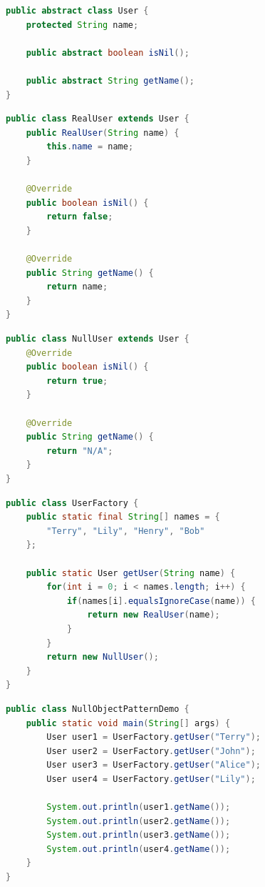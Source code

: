 \vspace{0.5cm}

\begin{lstlisting}[language=Java, title=User.java]
public abstract class User {
    protected String name;

    public abstract boolean isNil();

    public abstract String getName();
}
\end{lstlisting}

\begin{lstlisting}[language=Java, title=RealUser.java]
public class RealUser extends User {
    public RealUser(String name) {
        this.name = name;
    }

    @Override
    public boolean isNil() {
        return false;
    }

    @Override
    public String getName() {
        return name;
    }
}
\end{lstlisting}

\begin{lstlisting}[language=Java, title=NullUser.java]
public class NullUser extends User {
    @Override
    public boolean isNil() {
        return true;
    }

    @Override
    public String getName() {
        return "N/A";
    }
}
\end{lstlisting}

\begin{lstlisting}[language=Java, title=UserFactory.java]
public class UserFactory {
    public static final String[] names = {
        "Terry", "Lily", "Henry", "Bob"
    };

    public static User getUser(String name) {
        for(int i = 0; i < names.length; i++) {
            if(names[i].equalsIgnoreCase(name)) {
                return new RealUser(name);
            }
        }
        return new NullUser();
    }
}
\end{lstlisting}

\begin{lstlisting}[language=Java, title=NullObjectPatternDemo.java]
public class NullObjectPatternDemo {
    public static void main(String[] args) {
        User user1 = UserFactory.getUser("Terry");
        User user2 = UserFactory.getUser("John");
        User user3 = UserFactory.getUser("Alice");
        User user4 = UserFactory.getUser("Lily");

        System.out.println(user1.getName());
        System.out.println(user2.getName());
        System.out.println(user3.getName());
        System.out.println(user4.getName());
    }
}
\end{lstlisting}

